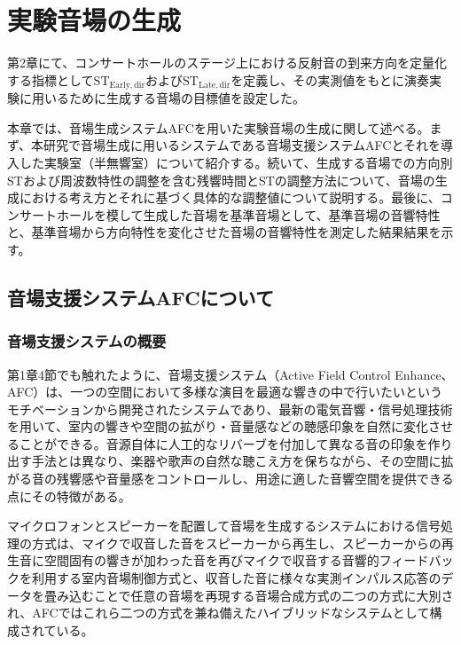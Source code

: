 \documentclass[11pt,a4j]{jreport}
\begin{document}
\chapter{実験音場の生成}

第2章にて、コンサートホールのステージ上における反射音の到来方向を定量化する指標として$\mathrm{ST_{Early,dir}}$および$\mathrm{ST_{Late,dir}}$を定義し、その実測値をもとに演奏実験に用いるために生成する音場の目標値を設定した。

本章では、音場生成システムAFCを用いた実験音場の生成に関して述べる。まず、本研究で音場生成に用いるシステムである音場支援システムAFCとそれを導入した実験室（半無響室）について紹介する。続いて、生成する音場での方向別STおよび周波数特性の調整を含む残響時間とSTの調整方法について、音場の生成における考え方とそれに基づく具体的な調整値について説明する。最後に、コンサートホールを模して生成した音場を基準音場として、基準音場の音響特性と、基準音場から方向特性を変化させた音場の音響特性を測定した結果結果を示す。


\section{音場支援システムAFCについて}

\subsection{音場支援システムの概要}
第1章4節でも触れたように、音場支援システム（Active Field Control Enhance、AFC）は、一つの空間において多様な演目を最適な響きの中で行いたいというモチベーションから開発されたシステムであり、最新の電気音響・信号処理技術を用いて、室内の響きや空間の拡がり・音量感などの聴感印象を自然に変化させることができる\cite{AFCの概要}。音源自体に人工的なリバーブを付加して異なる音の印象を作り出す手法とは異なり、楽器や歌声の自然な聴こえ方を保ちながら、その空間に拡がる音の残響感や音量感をコントロールし、用途に適した音響空間を提供できる点にその特徴がある。

マイクロフォンとスピーカーを配置して音場を生成するシステムにおける信号処理の方式は、マイクで収音した音をスピーカーから再生し、スピーカーからの再生音に空間固有の響きが加わった音を再びマイクで収音する音響的フィードバックを利用する室内音場制御方式と、収音した音に様々な実測インパルス応答のデータを畳み込むことで任意の音場を再現する音場合成方式の二つの方式に大別され、AFCではこれら二つの方式を兼ね備えたハイブリッドなシステムとして構成されている\cite{AFCEnhance}。

\newpage
\end{document}
